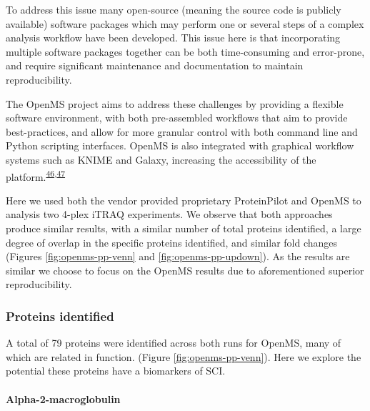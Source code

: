 \documentclass[
]{article}
\begin{document}
To address this issue many open-source (meaning the source code is publicly available) software packages which may perform one or several steps of a complex analysis workflow have been developed.
This issue here is that incorporating multiple software packages together can be both time-consuming and error-prone, and require significant maintenance and documentation to maintain reproducibility.

The OpenMS project aims to address these challenges by providing a flexible software environment, with both pre-assembled workflows that aim to provide best-practices, and allow for more granular control with both command line and Python scripting interfaces.
OpenMS is also integrated with graphical workflow systems such as KNIME and Galaxy, increasing the accessibility of the platform.\textsuperscript{\protect\hyperlink{ref-berthold_knime_2009}{46},\protect\hyperlink{ref-goecks_galaxy_2010}{47}}

Here we used both the vendor provided proprietary ProteinPilot and OpenMS to analysis two 4-plex iTRAQ experiments.
We observe that both approaches produce similar results, with a similar number of total proteins identified, a large degree of overlap in the specific proteins identified, and similar fold changes (Figures \ref{fig:openms-pp-venn} and \ref{fig:openms-pp-updown}).
As the results are similar we choose to focus on the OpenMS results due to aforementioned superior reproducibility.

\hypertarget{proteins-identified}{%
\subsubsection{Proteins identified}\label{proteins-identified}}

A total of 79 proteins were identified across both runs for OpenMS, many of which are related in function. (Figure \ref{fig:openms-pp-venn}).
Here we explore the potential these proteins have a biomarkers of SCI.

\hypertarget{alpha-2-macroglobulin}{%
\paragraph{Alpha-2-macroglobulin}\label{alpha-2-macroglobulin}}
\end{document}
